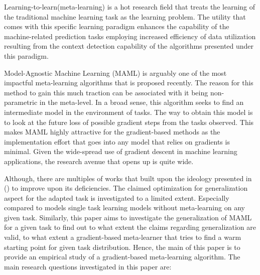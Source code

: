 Learning-to-learn(meta-learning) is a hot research field that treats the learning of the traditional machine learning task as the learning problem. The utility that comes with this specific learning paradigm enhances the capability of the machine-related prediction tasks employing increased efficiency of data utilization resulting from the context detection capability of the algorithms presented under this paradigm. 

Model-Agnostic Machine Learning (MAML)\cite{Finn2017} is arguably one of the most impactful meta-learning algorithms that is proposed recently. The reason for this method to gain this much traction can be associated with it being non-parametric in the meta-level. In a broad sense, this algorithm seeks to find an intermediate model in the environment of tasks. The way to obtain this model is to look at the future loss of possible gradient steps from the tasks observed. This makes MAML highly attractive for the gradient-based methods as the implementation effort that goes into any model that relies on gradients is minimal. Given the wide-spread use of gradient descent in machine learning applications, the research avenue that \cite{Finn2017} opens up is quite wide.

Although, there are multiples of works that built upon the ideology presented in \cite{Finn2017} (\eg \cite{Flennerhag2019,Nichol2018,Rajasegaran2020,Collins2020,Guiroy2019a, Antoniou2019}) to improve upon its deficiencies. The claimed optimization for generalization \cite {Nichol2018, Finn2017} aspect for the adapted task is investigated to a limited extent. Especially compared to models single task learning models without meta-learning on any given task. Similarly, this paper aims to investigate the generalization of MAML for a given task to find out to what extent the claims regarding generalization are valid, to what extent a gradient-based meta-learner that tries to find a warm starting point for given task distribution. Hence, the main of this paper is to provide an empirical study of a gradient-based meta-learning algorithm. The main research questions investigated in this paper are:

